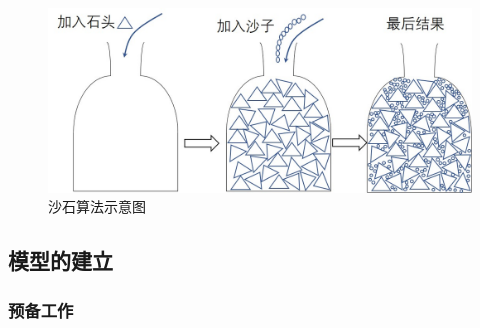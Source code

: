 \documentclass{whutmod}
\begin{document}
	    
	    \begin{figure}[H]
	    	\centering
	    	\includegraphics[width=.8\textwidth]{figures/shashi.jpg}
	    	\caption{沙石算法示意图}\label{shashi}
	    \end{figure}
	    
    
	    \subsection{模型的建立}
	    \subsubsection{预备工作}
\end{document}
